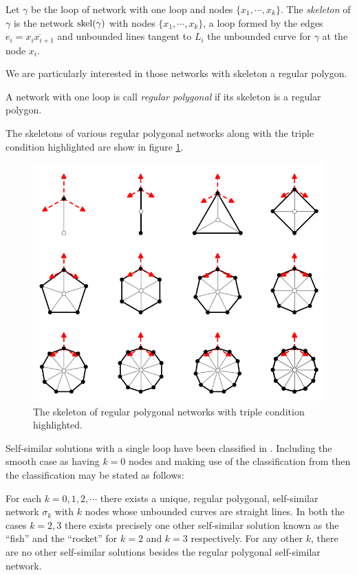 \documentclass[12pt]{amsart}
\begin{document}
\begin{defn}
\label{defn:skeleton}
Let \(\gamma\) be the loop of network with one loop and nodes \(\{x_1, \cdots, x_k\}\). The \emph{skeleton} of \(\gamma\) is the network \(\operatorname{skel}({\gamma})\) with nodes \(\{x_1, \cdots, x_k\}\), a loop formed by the edges \(e_i = \overline{x_ix_{i+1}}\) and unbounded lines tangent to \(L_i\) the unbounded curve for \(\gamma\) at the node \(x_i\).
\end{defn}

We are particularly interested in those networks with skeleton a regular polygon.

\begin{defn}
A network with one loop is call \emph{regular polygonal} if its skeleton is a regular polygon.
\end{defn}

The skeletons of various regular polygonal networks along with the triple condition highlighted are show in figure \ref{fg:regularpolygon}.

\begin{figure}[htb]
\centering
\includegraphics[width=.9\linewidth]{regularpolygon}
\caption{The skeleton of regular polygonal networks with triple condition highlighted.}
\label{fg:regularpolygon}
\end{figure}

Self-similar solutions with a single loop have been classified in \cite{MR2340176}. Including the smooth case as having \(k=0\) nodes and making use of the classification from \cite{MR845704} then the classification may be stated as follows:

\begin{theorem}[\cite{MR2340176,MR845704}]
For each \(k = 0, 1, 2, \cdots\) there exists a unique, regular polygonal, self-similar network \(\sigma_k\) with \(k\) nodes whose unbounded curves are straight lines. In both the cases \(k = 2,3\) there exists precisely one other self-similar solution known as the ``fish'' and the ``rocket'' for \(k = 2\) and \(k = 3\) respectively. For any other \(k\), there are no other self-similar solutions besides the regular polygonal self-similar network.
\end{theorem}
\end{document}
